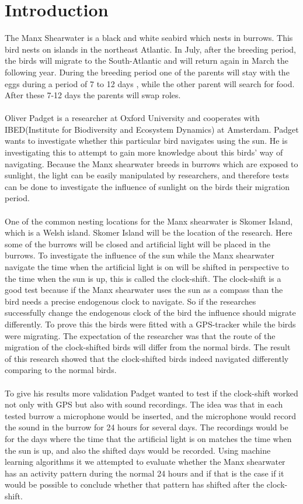 \documentclass[a4paper]{article}
\begin{document}
\section*{Introduction}
The Manx Shearwater is a black and white seabird which nests in burrows. This bird nests on islands in the northeast Atlantic. In July, after the breeding period, the birds will migrate to the South-Atlantic and will return again in March the following year. During the breeding period one of the parents will stay with the eggs during a period of 7 to 12 days , while the other parent will search for food. After these 7-12 days the parents will swap roles.\\\\
Oliver Padget is a researcher at Oxford University and cooperates with IBED(Institute for Biodiversity and Ecosystem Dynamics) at Amsterdam. Padget wants to investigate whether this particular bird navigates using the sun. He is investigating this to attempt to gain more knowledge about this birds' way of navigating. Because the Manx shearwater breeds in burrows which are exposed to sunlight, the light can be easily manipulated by researchers, and therefore tests can be done to investigate the influence of sunlight on the birds their migration period.\\\\
One of the common nesting locations for the Manx shearwater is Skomer Island, which is a Welsh island. Skomer Island will be the location of the research. Here some of the burrows will be closed and artificial light will be placed in the burrows. To investigate the influence of the sun while the Manx shearwater navigate the time when the artificial light is on will be shifted in perspective to the time when the sun is up, this is called the clock-shift. The clock-shift is a good test because if the Manx shearwater uses the sun as a compass than the bird needs a precise endogenous clock to navigate. So if the researches successfully change the endogenous clock of the bird the influence should migrate differently. To prove this the birds were fitted with a GPS-tracker while the birds were migrating. The expectation of the researcher was that the route of the migration of the clock-shifted birds will differ from the normal birds. The result of this research showed that the clock-shifted birds indeed navigated differently comparing to the normal birds.\\\\
To give his results more validation Padget wanted to test if the clock-shift worked not only with GPS but also with sound recordings. The idea was that in each tested burrow a microphone would be inserted, and the microphone would record the sound in the burrow for 24 hours for several days. The recordings would be for the days where the time that the artificial light  is on matches the time when the sun is up, and also the shifted days would be recorded. Using machine learning algorithms it we attempted to evaluate whether the Manx shearwater has an activity pattern during the normal 24 hours and if that is the case  if it would be possible to conclude whether that pattern has shifted after the clock-shift. 
\end{document}

